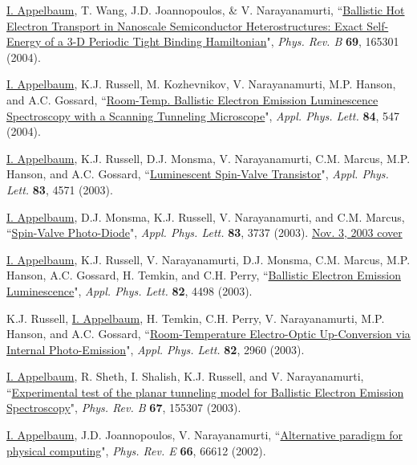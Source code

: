 \documentclass[paper=letter,fontsize=11pt]{scrartcl} %
\newcommand{\PaperEntry}[7]{
		\noindent #1, ``\href{#7}{#2}", \textit{#3} \textbf{#4}, #5 (#6).}
\begin{document}
\begin{etaremune}
\item\PaperEntry{\underline{I. Appelbaum}, T. Wang, J.D. Joannopoulos, \& V. Narayanamurti}{Ballistic Hot Electron Transport in Nanoscale Semiconductor Heterostructures: Exact Self-Energy of a 3-D Periodic Tight Binding Hamiltonian}{Phys. Rev. B}{69}{165301}{2004}{http://dx.doi.org/10.1103/PhysRevB.69.165301} 

\item\PaperEntry{\underline{I. Appelbaum}, K.J. Russell, M. Kozhevnikov, V. Narayanamurti, M.P. Hanson, and A.C. Gossard}{Room-Temp. Ballistic Electron Emission Luminescence Spectroscopy with a Scanning Tunneling Microscope}{Appl. Phys. Lett.}{84}{547}{2004}{http://dx.doi.org/10.1063/1.1644329}

\item\PaperEntry{\underline{I. Appelbaum}, K.J. Russell, D.J. Monsma, V. Narayanamurti, C.M. Marcus, M.P. Hanson, and A.C. Gossard}{Luminescent Spin-Valve Transistor}{Appl. Phys. Lett.}{83}{4571}{2003}{http://link.aip.org/link/doi/10.1063/1.1630838}

\item\PaperEntry{\underline{I. Appelbaum}, D.J. Monsma, K.J. Russell, V. Narayanamurti, and C.M. Marcus}{Spin-Valve Photo-Diode}{Appl. Phys. Lett.}{83}{3737}{2003}{http://dx.doi.org/10.1063/1.1623315} \href{http://scitation.aip.org/apl/covers/83_18.jsp}{Nov. 3, 2003 cover} 

\item\PaperEntry{\underline{I. Appelbaum}, K.J. Russell, V. Narayanamurti, D.J. Monsma, C.M. Marcus, M.P. Hanson, A.C. Gossard, H. Temkin, and C.H. Perry}{Ballistic Electron Emission Luminescence}{Appl. Phys. Lett.}{82}{4498}{2003}{http://dx.doi.org/10.1063/1.1584524} 

\item\PaperEntry{K.J. Russell, \underline{I. Appelbaum}, H. Temkin, C.H. Perry, V. Narayanamurti, M.P. Hanson, and A.C. Gossard}{Room-Temperature Electro-Optic Up-Conversion via Internal Photo-Emission}{Appl. Phys. Lett.}{82}{2960}{2003}{http://link.aip.org/link/doi/10.1063/1.1571981}

\item\PaperEntry{\underline{I. Appelbaum}, R. Sheth, I. Shalish, K.J. Russell, and V. Narayanamurti}{Experimental test of the planar tunneling model for Ballistic Electron Emission Spectroscopy}{Phys. Rev. B}{67}{155307}{2003}{http://dx.doi.org/10.1103/PhysRevB.67.155307} 

\item\PaperEntry{\underline{I. Appelbaum}, J.D. Joannopoulos, V. Narayanamurti}{Alternative paradigm for physical computing}{Phys. Rev. E}{66}{66612}{2002}{http://dx.doi.org/10.1103/PhysRevE.66.066612}


\end{etaremune}
\end{document}
